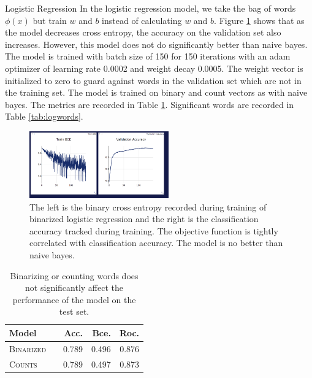 \documentclass[11pt]{article}
\begin{document}
\begin{subsection}{Logistic Regression}
In the logistic regression model, we take the bag of words $\phi(x)$ but train $w$ and $b$ instead of calculating $w$ and $b$. Figure \ref{fig:logtrain} shows that as the model decreases cross entropy, the accuracy on the validation set also increases. However, this model does not do significantly better than naive bayes. The model is trained with batch size of 150 for 150 iterations with an adam optimizer of learning rate 0.0002 and weight decay 0.0005. The weight vector is initialized to zero to guard against words in the validation set which are not in the training set. The model is trained on binary and count vectors as with naive bayes. The metrics are recorded in Table \ref{tab:logreg}. Significant words are recorded in Table \ref{tab:logwords}.


\begin{figure}
  \centering
  \includegraphics[width=6cm]{imgs/logtrain}
  \caption{\label{fig:logtrain} The left is the binary cross entropy recorded during training of binarized logistic regression and the right is the classification accuracy tracked during training. The objective function is tightly correlated with classification accuracy. The model is no better than naive bayes.}
\end{figure}

\begin{table}[h]
\centering
\begin{tabular}{llrrr}
 \toprule
 Model &  & Acc. & Bce. & Roc.\\
 \midrule
 \textsc{Binarized} & & 0.789 & 0.496 & 0.876\\
 \textsc{Counts} & & 0.789  & 0.497 & 0.873\\
 \bottomrule
\end{tabular}
\caption{\label{tab:logreg} Binarizing or counting words does not significantly affect the performance of the model on the test set.}
\end{table}



\end{subsection}
\end{document}
